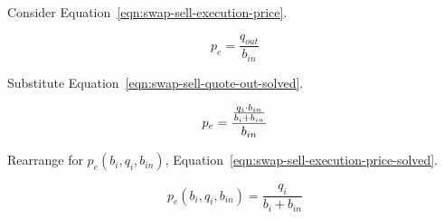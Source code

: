 \documentclass[table, twocolumn]{article}
\begin{document}
Consider Equation~\ref{eqn:swap-sell-execution-price}.

\begin{equation}
	p_e = \frac{q_{out}}{b_{in}} \nonumber
\end{equation}

Substitute Equation~\ref{eqn:swap-sell-quote-out-solved}.

\begin{equation}
	p_e = \frac{\frac{q_i \cdot b_{in}}{b_i + b_{in}}}{b_{in}} \nonumber \\
\end{equation}

Rearrange for $p_e(b_i, q_i, b_{in})$,
Equation~\ref{eqn:swap-sell-execution-price-solved}.

\begin{equation}
	p_e (b_i, q_i, b_{in}) = \frac{q_i}{b_i + b_{in}} \nonumber
\end{equation}
\end{document}
